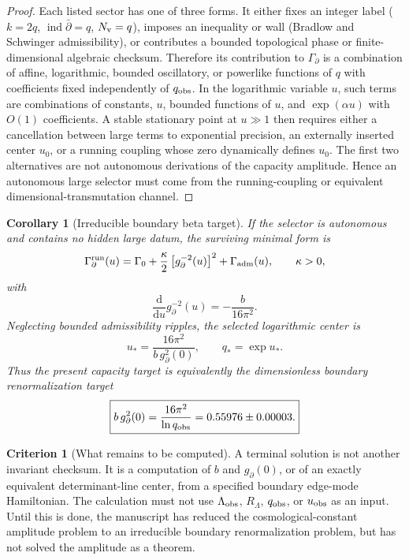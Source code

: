\documentclass[aps,prd,reprint,nofootinbib,superscriptaddress,floatfix]{revtex4-2}
\numberwithin{equation}{section}
\theoremstyle{definition}
\newtheorem{criterion}{Criterion}[section]
\theoremstyle{plain}
\newtheorem{corollary}{Corollary}[section]
\newcommand{\dd}{\mathrm d}
\begin{document}
\begin{proof}
Each listed sector has one of three forms.  It either fixes an integer label
(\(k=2q\), \(\operatorname{ind}\bar\partial=q\), \(N_{\rm v}=q\)), imposes an
inequality or wall (Bradlow and Schwinger admissibility), or contributes a
bounded topological phase or finite-dimensional algebraic checksum.  Therefore
its contribution to \(\Gamma_\partial\) is a combination of affine, logarithmic,
bounded oscillatory, or powerlike functions of \(q\) with coefficients fixed
independently of \(q_{\rm obs}\).  In the logarithmic variable \(u\), such terms
are combinations of constants, \(u\), bounded functions of \(u\), and
\(\exp(\alpha u)\) with \(O(1)\) coefficients.  A stable stationary point at
\(u\gg1\) then requires either a cancellation between large terms to exponential
precision, an externally inserted center \(u_0\), or a running coupling whose
zero dynamically defines \(u_0\).  The first two alternatives are not autonomous
derivations of the capacity amplitude.  Hence an autonomous large selector must
come from the running-coupling or equivalent dimensional-transmutation channel.
\end{proof}

\begin{corollary}[Irreducible boundary beta target]\label{cor:irreducible-beta-target}
If the selector is autonomous and contains no hidden large datum, the surviving
minimal form is
\begin{equation}
\Gamma_{\partial}^{\rm run}(u)
=
\Gamma_0+
\frac{\kappa}{2}
\left[g_\partial^{-2}(u)\right]^2
+\Gamma_{\rm adm}(u),
\qquad
\kappa>0,
\end{equation}
with
\begin{equation}
\frac{\dd}{\dd u}g_\partial^{-2}(u)
=
-\frac{b}{16\pi^2}.
\end{equation}
Neglecting bounded admissibility ripples, the selected logarithmic center is
\begin{equation}
u_*=\frac{16\pi^2}{b\,g_\partial^2(0)},
\qquad
q_*=\exp u_* .
\end{equation}
Thus the present capacity target is equivalently the dimensionless boundary
renormalization target
\begin{equation}
\boxed{
b\,g_\partial^2(0)
=
\frac{16\pi^2}{\ln q_{\rm obs}}
=
0.55976\pm0.00003 .
}
\end{equation}
\end{corollary}

\begin{criterion}[What remains to be computed]\label{crit:terminal-computation}
A terminal solution is not another invariant checksum.  It is a computation of
\(b\) and \(g_\partial(0)\), or of an exactly equivalent determinant-line
center, from a specified boundary edge-mode Hamiltonian.  The calculation must
not use \(\Lambda_{\rm obs}\), \(R_\Lambda\), \(q_{\rm obs}\), or
\(u_{\rm obs}\) as an input.  Until this is done, the manuscript has reduced the
cosmological-constant amplitude problem to an irreducible boundary
renormalization problem, but has not solved the amplitude as a theorem.
\end{criterion}
\end{document}
